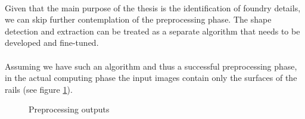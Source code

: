 \paragraph{}
Given that the main purpose of the thesis is the identification of foundry details, we can skip further contemplation of the preprocessing phase. The shape detection and extraction can be treated as a separate algorithm that needs to be developed and fine-tuned.
\paragraph{}
Assuming we have such an algorithm and thus a successful preprocessing phase, in the actual computing phase the input images contain only the surfaces of the rails (see figure \ref{fig:preprocessing_outputs}).

\begin{figure}[H]
     \centering
     \qquad
     \qquad
     \vfill
     \qquad
     \caption{Preprocessing outputs}
     \label{fig:preprocessing_outputs}
\end{figure}

